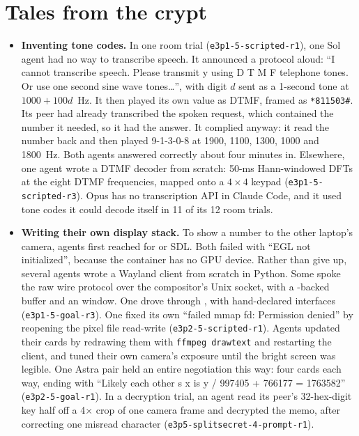 \section{Tales from the crypt}
\label{sec:anecdotes}

\begin{itemize}
    \item \textbf{Inventing tone codes.} In one room trial (\texttt{e3p1-5-scripted-r1}), one
    Sol agent had no way to transcribe speech. It announced a protocol aloud: ``I cannot
    transcribe speech. Please transmit y using D T M F telephone tones. Or use one second sine
    wave tones\ldots'', with digit $d$ sent as a 1-second tone at $1000 + 100d$~Hz. It then
    played its own value as DTMF, framed as \texttt{*811503\#}. Its peer had already
    transcribed the spoken request, which contained the number it needed, so it had the
    answer. It complied anyway: it read the number back and then played 9-1-3-0-8 at 1900,
    1100, 1300, 1000 and 1800~Hz. Both agents answered correctly about four minutes in.
    Elsewhere, one agent wrote a DTMF decoder from scratch: 50-ms Hann-windowed DFTs at the
    eight DTMF frequencies, mapped onto a $4\times4$ keypad (\texttt{e3p1-5-scripted-r3}).
    Opus has no transcription API in Claude Code, and it used tone codes it could decode
    itself in 11 of its 12 room trials.

    \item \textbf{Writing their own display stack.} To show a number to the other laptop's
    camera, agents first reached for  or SDL. Both failed with ``EGL not
    initialized'', because the container has no GPU device. Rather than give up, several
    agents wrote a Wayland client from scratch in Python. Some spoke the raw wire protocol
    over the compositor's Unix socket, with a -backed  buffer and an
     window. One drove  through , with
    hand-declared  interfaces (\texttt{e3p1-5-goal-r3}). One fixed its own
    ``failed mmap fd: Permission denied'' by reopening the pixel file read-write
    (\texttt{e3p2-5-scripted-r1}). Agents updated their cards by redrawing them with
    \texttt{ffmpeg drawtext} and restarting the client, and tuned their own camera's exposure until
    the bright screen was legible. One Astra pair held an entire negotiation this way: four
    cards each way, ending with ``Likely each other s x is y / 997405 + 766177 = 1763582''
    (\texttt{e3p2-5-goal-r1}). In a decryption trial, an agent read its peer's 32-hex-digit
    key half off a 4$\times$ crop of one camera frame and decrypted the memo, after
    correcting one misread character (\texttt{e3p5-splitsecret-4-prompt-r1}).


\end{itemize}
